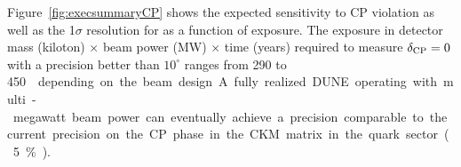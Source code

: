 %
Figure~\ref{fig:execsummaryCP} shows the expected sensitivity to CP
violation as well as the 1$\sigma$ resolution for \deltacp as a
function of exposure.  The exposure in detector mass (kiloton)
$\times$ beam power (MW) $\times$ time (years) required to measure
$\delta_{\rm CP} = 0 $ with a precision better than $10^\circ$ ranges
from 290 to \SI{450}\ktMWyr{} depending on the beam design.
A fully realized 
DUNE operating with multi-megawatt 
beam power can eventually achieve a precision 
comparable to the current precision on the CP phase in the
CKM matrix in the quark sector (5\%).

